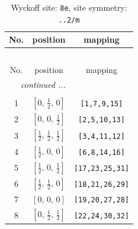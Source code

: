 \documentclass[fleqn,8pt]{jsarticle}
\begin{document}
\renewcommand{\arraystretch}{1.2}
\begin{longtable}{ccc}
\caption{Wyckoff site: {\tt 8e}, site symmetry: {\tt ..2/m}}
 \\
 \hline \hline
No. & position & mapping \\ \hline \endfirsthead

\multicolumn{2}{l}{\tablename\ \thetable{}} \\
 \hline \hline
No. & position & mapping \\ \hline \endhead

 \hline \hline
\multicolumn{2}{r}{\footnotesize\it continued ...} \\ \endfoot

 \hline \hline
\multicolumn{2}{r}{} \\ \endlastfoot

1 & $\left[ 0,\, \frac{1}{2},\, 0 \right]$ & {\tt [1,7,9,15]} \\ \hline
2 & $\left[ 0,\, 0,\, \frac{1}{2} \right]$ & {\tt [2,5,10,13]} \\ \hline
3 & $\left[ \frac{1}{2},\, \frac{1}{2},\, \frac{1}{2} \right]$ & {\tt [3,4,11,12]} \\ \hline
4 & $\left[ \frac{1}{2},\, 0,\, 0 \right]$ & {\tt [6,8,14,16]} \\ \hline
5 & $\left[ \frac{1}{2},\, 0,\, \frac{1}{2} \right]$ & {\tt [17,23,25,31]} \\ \hline
6 & $\left[ \frac{1}{2},\, \frac{1}{2},\, 0 \right]$ & {\tt [18,21,26,29]} \\ \hline
7 & $\left[ 0,\, 0,\, 0 \right]$ & {\tt [19,20,27,28]} \\ \hline
8 & $\left[ 0,\, \frac{1}{2},\, \frac{1}{2} \right]$ & {\tt [22,24,30,32]} \\
\end{longtable}
\renewcommand{\arraystretch}{1.2}
\end{document}
